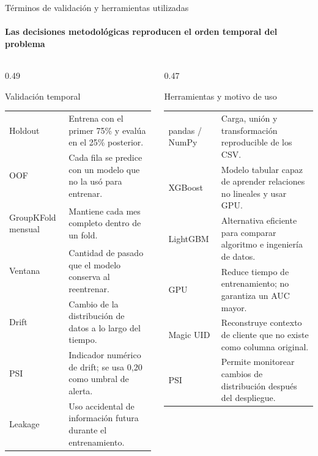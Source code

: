 \documentclass[aspectratio=169,11pt]{beamer}
\begin{document}
\begin{frame}{Términos de validación y herramientas utilizadas}
  \framesubtitle{Las decisiones metodológicas reproducen el orden temporal del problema}
  \begin{columns}[T]
    \begin{column}{0.49\textwidth}
      \begin{block}{Validación temporal}
        \scriptsize
        \renewcommand{\arraystretch}{0.93}
        \begin{tabularx}{\textwidth}{>{\bfseries\color{teal}\raggedright\arraybackslash}p{} >{\raggedright\arraybackslash}X}
          Holdout & Entrena con el primer 75\% y evalúa en el 25\% posterior.\\
          OOF & Cada fila se predice con un modelo que no la usó para entrenar.\\
          GroupKFold mensual & Mantiene cada mes completo dentro de un fold.\\
          Ventana & Cantidad de pasado que el modelo conserva al reentrenar.\\
          Drift & Cambio de la distribución de datos a lo largo del tiempo.\\
          PSI & Indicador numérico de drift; se usa 0,20 como umbral de alerta.\\
          Leakage & Uso accidental de información futura durante el entrenamiento.\\
        \end{tabularx}
      \end{block}
    \end{column}
    \begin{column}{0.47\textwidth}
      \begin{block}{Herramientas y motivo de uso}
        \scriptsize
        \renewcommand{\arraystretch}{0.93}
        \begin{tabularx}{\textwidth}{>{\bfseries\color{teal}\raggedright\arraybackslash}p{} >{\raggedright\arraybackslash}X}
          pandas / NumPy & Carga, unión y transformación reproducible de los CSV.\\
          XGBoost & Modelo tabular capaz de aprender relaciones no lineales y usar GPU.\\
          LightGBM & Alternativa eficiente para comparar algoritmo e ingeniería de datos.\\
          GPU & Reduce tiempo de entrenamiento; no garantiza un AUC mayor.\\
          Magic UID & Reconstruye contexto de cliente que no existe como columna original.\\
          PSI & Permite monitorear cambios de distribución después del despliegue.\\
        \end{tabularx}
      \end{block}
    \end{column}
  \end{columns}
\end{frame}
\end{document}
